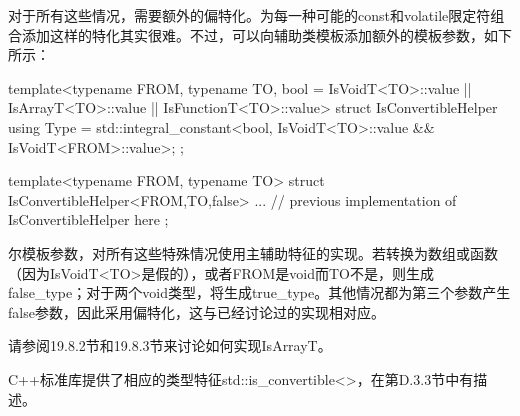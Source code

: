 对于所有这些情况，需要额外的偏特化。为每一种可能的const和volatile限定符组合添加这样的特化其实很难。不过，可以向辅助类模板添加额外的模板参数，如下所示：

\begin{cpp}
template<typename FROM, typename TO, bool = IsVoidT<TO>::value
								|| IsArrayT<TO>::value
								|| IsFunctionT<TO>::value>
struct IsConvertibleHelper {
	using Type = std::integral_constant<bool,
	IsVoidT<TO>::value
	&& IsVoidT<FROM>::value>;
};

template<typename FROM, typename TO>
struct IsConvertibleHelper<FROM,TO,false> {
	... // previous implementation of IsConvertibleHelper here
};
\end{cpp}

尔模板参数，对所有这些特殊情况使用主辅助特征的实现。若转换为数组或函数（因为IsVoidT<TO>是假的），或者FROM是void而TO不是，则生成false\_type；对于两个void类型，将生成true\_type。其他情况都为第三个参数产生false参数，因此采用偏特化，这与已经讨论过的实现相对应。

请参阅19.8.2节和19.8.3节来讨论如何实现IsArrayT。

C++标准库提供了相应的类型特征std::is\_convertible<>，在第D.3.3节中有描述。



